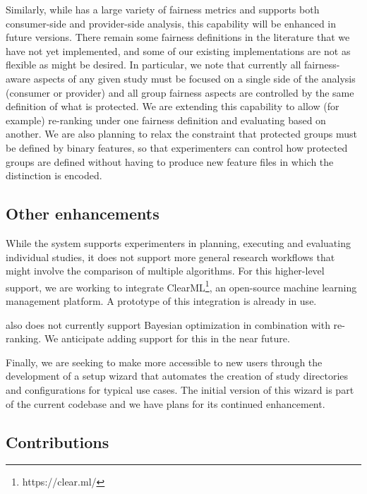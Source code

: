 Similarly, while \libauto{} has a large variety of fairness metrics and supports both consumer-side and provider-side analysis, this capability will be enhanced in future versions. There remain some fairness definitions in the literature that we have not yet implemented, and some of our existing implementations are not as flexible as might be desired. In particular, we note that currently all fairness-aware aspects of any given study must be focused on a single side of the analysis (consumer or provider) and all group fairness aspects are controlled by the same definition of what is protected. We are extending this capability to allow (for example) re-ranking under one fairness definition and evaluating based on another. We are also planning to relax the constraint that protected groups must be defined by binary features, so that experimenters can control how protected groups are defined without having to produce new feature files in which the distinction is encoded. 


\subsection{Other enhancements}

While the system supports experimenters in planning, executing and evaluating individual studies, it does not support more general research workflows that might involve the comparison of multiple algorithms. For this higher-level support, we are working to integrate ClearML\footnote{https://clear.ml/}, an open-source machine learning management platform. A prototype of this integration is already in use.

\libauto{} also does not currently support Bayesian optimization in combination with re-ranking. We anticipate adding support for this in the near future.  

Finally, we are seeking to make \libauto{} more accessible to new users through the development of a setup wizard that automates the creation of study directories and configurations for typical use cases. The initial version of this wizard is part of the current codebase and we have plans for its continued enhancement. 


\subsection{Contributions}

